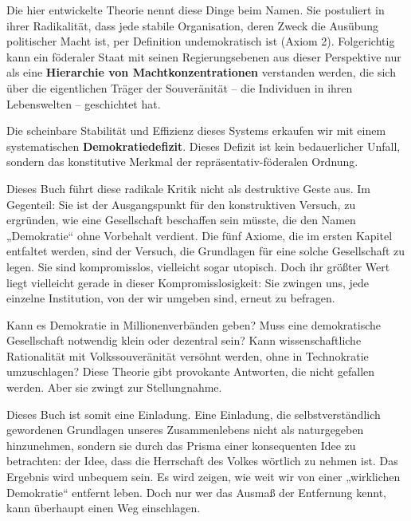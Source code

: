Die hier entwickelte Theorie nennt diese Dinge beim Namen. Sie postuliert in ihrer Radikalität, dass jede stabile Organisation, deren Zweck die
Ausübung politischer Macht ist, per Definition undemokratisch ist (Axiom 2). Folgerichtig kann ein föderaler Staat mit seinen Regierungsebenen aus
dieser Perspektive nur als eine \textbf{Hierarchie von Machtkonzentrationen} verstanden werden, die sich über die eigentlichen Träger der
Souveränität – die Individuen in ihren Lebenswelten – geschichtet hat.

Die scheinbare Stabilität und Effizienz dieses Systems erkaufen wir mit einem systematischen \textbf{Demokratiedefizit}. Dieses Defizit ist kein
bedauerlicher Unfall, sondern das konstitutive Merkmal der repräsentativ-föderalen Ordnung.

Dieses Buch führt diese radikale Kritik nicht als destruktive Geste aus. Im Gegenteil: Sie ist der Ausgangspunkt für den konstruktiven Versuch, zu
ergründen, wie eine Gesellschaft beschaffen sein müsste, die den Namen „Demokratie“ ohne Vorbehalt verdient. Die fünf Axiome, die im ersten Kapitel
entfaltet werden, sind der Versuch, die Grundlagen für eine solche Gesellschaft zu legen. Sie sind kompromisslos, vielleicht sogar utopisch. Doch
ihr größter Wert liegt vielleicht gerade in dieser Kompromisslosigkeit: Sie zwingen uns, jede einzelne Institution, von der wir umgeben sind, erneut
zu befragen.

Kann es Demokratie in Millionenverbänden geben? Muss eine demokratische Gesellschaft notwendig klein oder dezentral sein? Kann wissenschaftliche
Rationalität mit Volkssouveränität versöhnt werden, ohne in Technokratie umzuschlagen? Diese Theorie gibt provokante Antworten, die nicht gefallen
werden. Aber sie zwingt zur Stellungnahme.

Dieses Buch ist somit eine Einladung. Eine Einladung, die selbstverständlich gewordenen Grundlagen unseres Zusammenlebens nicht als naturgegeben
hinzunehmen, sondern sie durch das Prisma einer konsequenten Idee zu betrachten: der Idee, dass die Herrschaft des Volkes wörtlich zu nehmen ist.
Das Ergebnis wird unbequem sein. Es wird zeigen, wie weit wir von einer „wirklichen Demokratie“ entfernt leben. Doch nur wer das Ausmaß der
Entfernung kennt, kann überhaupt einen Weg einschlagen.

